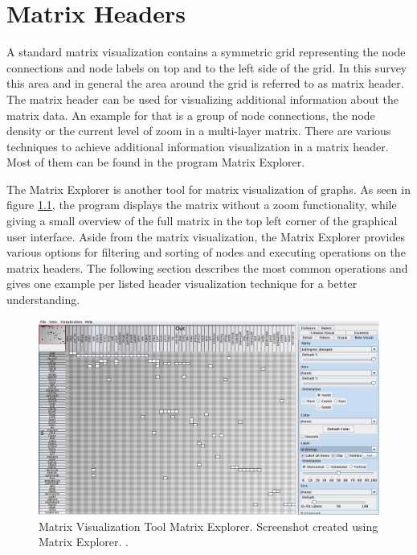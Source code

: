 %
%
% 
% 
% 


\chapter{Matrix Headers}
\label{chap:headers}

A standard matrix visualization contains a symmetric grid representing the node connections and node labels on top and to the left side of the grid. In this survey this area and in general the area around the grid is referred to as matrix header. The matrix header can be used for visualizing additional information about the matrix data. An example for that is a group of node connections, the node density or the current level of zoom in a multi-layer matrix.
There are various techniques to achieve additional information visualization in a matrix header. Most of them can be found in the program Matrix Explorer.

The Matrix Explorer is another tool for matrix visualization of graphs. As seen in figure \ref{fig:header_matrixexplorer}, the program displays the matrix without a zoom functionality, while giving a small overview of the full matrix in the top left corner of the graphical user interface. Aside from the matrix visualization, the Matrix Explorer provides various options for filtering and sorting of nodes and executing operations on the matrix headers. The following section describes the most common operations and gives one example per listed header visualization technique for a better understanding. 

\begin{figure}[H]
  \includegraphics[width=\textwidth]{images/Header_MatrixExplorer.png}
  \caption{Matrix Visualization Tool Matrix Explorer. Screenshot created using Matrix Explorer. \citep{henry-phd-2008}. \label{fig:header_matrixexplorer}}
\end{figure}

